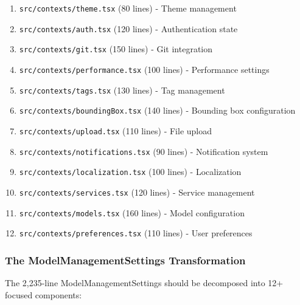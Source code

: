 \documentclass[11pt]{article}
\begin{document}
\begin{enumerate}
\item \texttt{src/contexts/theme.tsx} (80 lines) - Theme management
\item \texttt{src/contexts/auth.tsx} (120 lines) - Authentication state
\item \texttt{src/contexts/git.tsx} (150 lines) - Git integration
\item \texttt{src/contexts/performance.tsx} (100 lines) - Performance settings
\item \texttt{src/contexts/tags.tsx} (130 lines) - Tag management
\item \texttt{src/contexts/boundingBox.tsx} (140 lines) - Bounding box configuration
\item \texttt{src/contexts/upload.tsx} (110 lines) - File upload
\item \texttt{src/contexts/notifications.tsx} (90 lines) - Notification system
\item \texttt{src/contexts/localization.tsx} (100 lines) - Localization
\item \texttt{src/contexts/services.tsx} (120 lines) - Service management
\item \texttt{src/contexts/models.tsx} (160 lines) - Model configuration
\item \texttt{src/contexts/preferences.tsx} (110 lines) - User preferences
\end{enumerate}

\subsubsection{The ModelManagementSettings Transformation}

The 2,235-line ModelManagementSettings should be decomposed into 12+ focused components:
\end{document}
